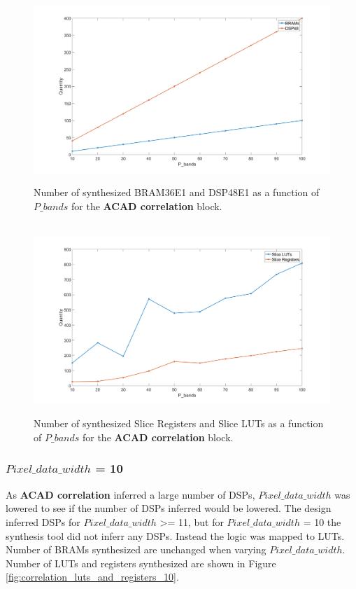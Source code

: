 \begin{figure}[H]

\hbox{\hspace*{-2cm}                                                           
   \includegraphics[scale=0.3]{images/number_of_BRAMS_and_DSP48_correlation_module.png}}
  \caption{Number of synthesized BRAM36E1 and DSP48E1 as a function of $P\_bands$ for the \textbf{ACAD correlation} block.  } 
  \label{fig:primitves_correlation}
\end{figure}


\begin{figure}[H]

\hbox{\hspace*{-2cm}                                                           
   \includegraphics[scale=0.3]{images/correlation_luts_and_registers.png}}
  \caption{Number of synthesized Slice Registers and Slice LUTs as a function of $P\_bands$ for the \textbf{ACAD correlation} block. } 
  \label{fig:luts_and_regs_corr}
\end{figure}

\subsubsection{$Pixel\_data\_width$ = 10}
 As \textbf{ACAD correlation} inferred a large number of DSPs, $Pixel\_data\_width$ was lowered to see if the number of DSPs inferred would be lowered. The design inferred DSPs for $Pixel\_data\_width$ >= 11, but for $Pixel\_data\_width$ = 10 the synthesis tool did not inferr any DSPs. Instead the logic was mapped to LUTs. Number of BRAMs synthesized are unchanged when varying $Pixel\_data\_width$. Number of LUTs and registers synthesized are shown in Figure  \ref{fig:correlation_luts_and_registers_10}. 
 
